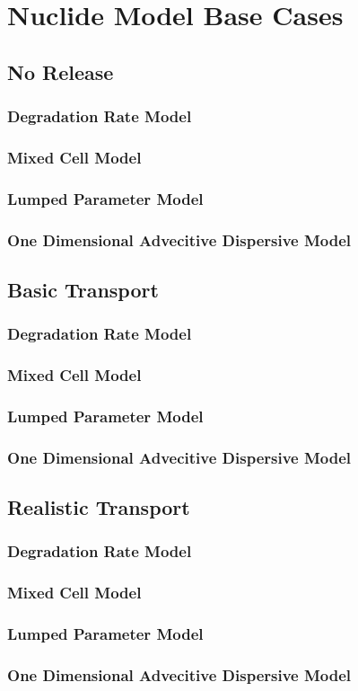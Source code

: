 \section{Nuclide Model Base Cases}\label{sec:nuclide_base_cases}
\subsection{No Release}
\subsubsection{Degradation Rate Model}
\subsubsection{Mixed Cell Model}
\subsubsection{Lumped Parameter Model}
\subsubsection{One Dimensional Advecitive Dispersive Model}
\subsection{Basic Transport}
\subsubsection{Degradation Rate Model}
\subsubsection{Mixed Cell Model}
\subsubsection{Lumped Parameter Model}
\subsubsection{One Dimensional Advecitive Dispersive Model}
\subsection{Realistic Transport}
\subsubsection{Degradation Rate Model}
\subsubsection{Mixed Cell Model}
\subsubsection{Lumped Parameter Model}
\subsubsection{One Dimensional Advecitive Dispersive Model}

